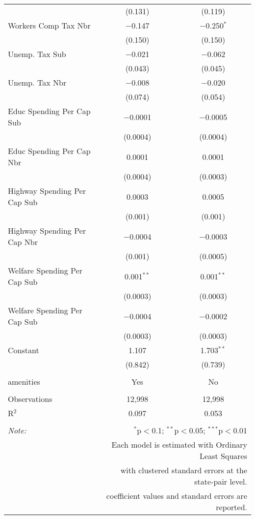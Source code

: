 \begin{table}[!htbp]
\begin{tabular}{@{\extracolsep{5pt}}lcc}
  & (0.131) & (0.119) \\ 
  Workers Comp Tax Nbr & $-$0.147 & $-$0.250$^{*}$ \\ 
  & (0.150) & (0.150) \\ 
  Unemp. Tax Sub & $-$0.021 & $-$0.062 \\ 
  & (0.043) & (0.045) \\ 
  Unemp. Tax Nbr & $-$0.008 & $-$0.020 \\ 
  & (0.074) & (0.054) \\ 
  Educ Spending Per Cap Sub & $-$0.0001 & $-$0.0005 \\ 
  & (0.0004) & (0.0004) \\ 
  Educ Spending Per Cap Nbr & 0.0001 & 0.0001 \\ 
  & (0.0004) & (0.0003) \\ 
  Highway Spending Per Cap Sub & 0.0003 & 0.0005 \\ 
  & (0.001) & (0.001) \\ 
  Highway Spending Per Cap Nbr & $-$0.0004 & $-$0.0003 \\ 
  & (0.001) & (0.0005) \\ 
  Welfare Spending Per Cap Sub & 0.001$^{**}$ & 0.001$^{**}$ \\ 
  & (0.0003) & (0.0003) \\ 
  Welfare Spending Per Cap Sub & $-$0.0004 & $-$0.0002 \\ 
  & (0.0003) & (0.0003) \\ 
  Constant & 1.107 & 1.703$^{**}$ \\ 
  & (0.842) & (0.739) \\ 
 \hline \\[-1.8ex] 
amenities & Yes & No \\ 
\hline \\[-1.8ex] 
Observations & 12,998 & 12,998 \\ 
R$^{2}$ & 0.097 & 0.053 \\ 
\hline 
\hline \\[-1.8ex] 
\textit{Note:}  & \multicolumn{2}{r}{$^{*}$p$<$0.1; $^{**}$p$<$0.05; $^{***}$p$<$0.01} \\ 
 & \multicolumn{2}{r}{Each model is estimated with Ordinary Least Squares} \\ 
 & \multicolumn{2}{r}{with clustered standard errors at the state-pair level.} \\ 
 & \multicolumn{2}{r}{coefficient values and standard errors are reported.} \\ 
\end{tabular} 
\end{table} 
